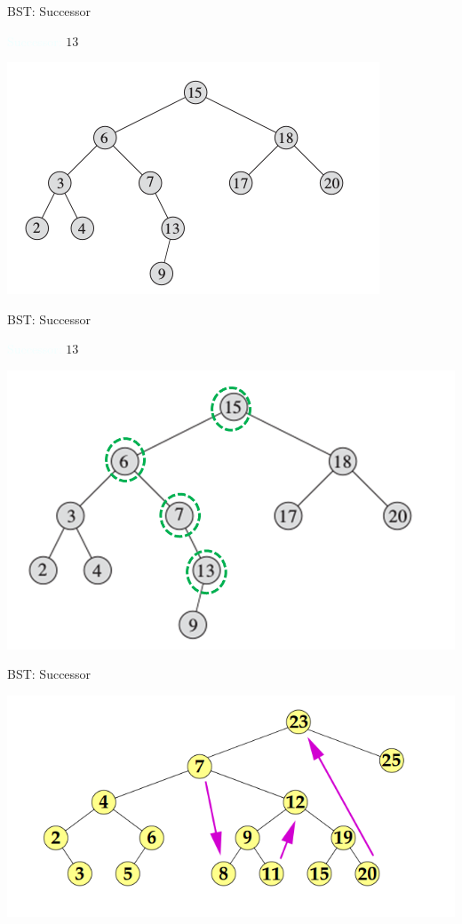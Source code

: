 \documentclass{beamer}
\newcommand{\tblue}[1]{{\Large {\textcolor{azure}{#1}}}}
\begin{document}
\begin{frame}{BST: Successor}

\tblue{Successor:} $13$
    \begin{center}
        \includegraphics[scale=0.7]{bstSearch.png}
    \end{center}
\end{frame}


\begin{frame}{BST: Successor}

\tblue{Successor:} $13$
    \begin{center}
        \includegraphics[scale=0.5]{bstSuccessor4.png}
    \end{center}
\end{frame}


\begin{frame}{BST: Successor}

    \begin{center}
        \includegraphics[scale=0.5]{bstSuccessor8.png}
    \end{center}
\end{frame}
\end{document}
